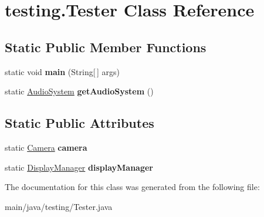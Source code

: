 \hypertarget{classtesting_1_1_tester}{}\section{testing.\+Tester Class Reference}
\label{classtesting_1_1_tester}
\subsection*{Static Public Member Functions}
\begin{DoxyCompactItemize}
\item 
\mbox{\label{classtesting_1_1_tester_a17d4ee81296e7204aefeb80bbfdbbd0f}} 
static void {\bfseries main} (String\mbox{[}$\,$\mbox{]} args)
\item 
\mbox{\label{classtesting_1_1_tester_a412bc40651ebbb37c82dceae983a68e3}} 
static \mbox{\hyperlink{classde_1_1me_1_1edgelord_1_1sjgl_1_1audio_1_1_audio_system}{Audio\+System}} {\bfseries get\+Audio\+System} ()
\end{DoxyCompactItemize}
\subsection*{Static Public Attributes}
\begin{DoxyCompactItemize}
\item 
\mbox{\label{classtesting_1_1_tester_af7b1e6ffabcf7a8550a1a3a23e02e5b3}} 
static \mbox{\hyperlink{classde_1_1me_1_1edgelord_1_1sjgl_1_1camera_1_1_camera}{Camera}} {\bfseries camera}
\item 
\mbox{\label{classtesting_1_1_tester_ae450d2ce3f31873d74667bbef9e645a4}} 
static \mbox{\hyperlink{classde_1_1me_1_1edgelord_1_1sjgl_1_1display_1_1_display_manager}{Display\+Manager}} {\bfseries display\+Manager}
\end{DoxyCompactItemize}


The documentation for this class was generated from the following file\+:\begin{DoxyCompactItemize}
\item 
main/java/testing/Tester.\+java\end{DoxyCompactItemize}
